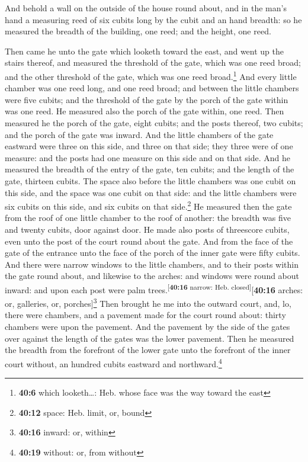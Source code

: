  And behold a wall on the outside of the house round
about, and in the man's hand a measuring reed of six cubits long by the
cubit and an hand breadth: so he measured the breadth of the building,
one reed; and the height, one reed.

 Then came he unto the gate which looketh toward the east,
and went up the stairs thereof, and measured the threshold of the gate,
which was one reed broad; and the other threshold of the gate, which was
one reed broad.\footnote{\textbf{40:6} which looketh\ldots: Heb. whose
  face was the way toward the east}  And every little
chamber was one reed long, and one reed broad; and between the little
chambers were five cubits; and the threshold of the gate by the porch of
the gate within was one reed.  He measured also the porch
of the gate within, one reed.  Then measured he the porch
of the gate, eight cubits; and the posts thereof, two cubits; and the
porch of the gate was inward.  And the little chambers of
the gate eastward were three on this side, and three on that side; they
three were of one measure: and the posts had one measure on this side
and on that side.  And he measured the breadth of the
entry of the gate, ten cubits; and the length of the gate, thirteen
cubits.  The space also before the little chambers was
one cubit on this side, and the space was one cubit on that side: and
the little chambers were six cubits on this side, and six cubits on that
side.\footnote{\textbf{40:12} space: Heb. limit, or, bound}
 He measured then the gate from the roof of one little
chamber to the roof of another: the breadth was five and twenty cubits,
door against door.  He made also posts of threescore
cubits, even unto the post of the court round about the gate.
 And from the face of the gate of the entrance unto the
face of the porch of the inner gate were fifty cubits. 
And there were narrow windows to the little chambers, and to their posts
within the gate round about, and likewise to the arches: and windows
were round about inward: and upon each post were palm
trees.\textsuperscript{{[}\textbf{40:16} narrow: Heb.
closed{]}}{[}\textbf{40:16} arches: or, galleries, or,
porches{]}\footnote{\textbf{40:16} inward: or, within} 
Then brought he me into the outward court, and, lo, there were chambers,
and a pavement made for the court round about: thirty chambers were upon
the pavement.  And the pavement by the side of the gates
over against the length of the gates was the lower pavement.
 Then he measured the breadth from the forefront of the
lower gate unto the forefront of the inner court without, an hundred
cubits eastward and northward.\footnote{\textbf{40:19} without: or, from
  without}

